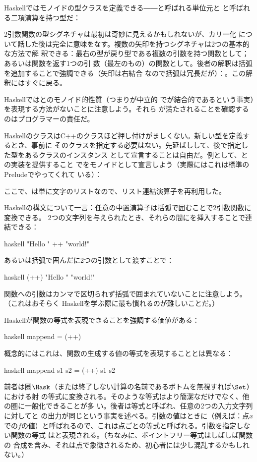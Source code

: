 Haskellではモノイドの型クラスを定義できる――と呼ばれる単位元と
と呼ばれる二項演算を持つ型だ：

2引数関数の型シグネチャは最初は奇妙に見えるかもしれないが、カリー化
について話した後は完全に意味をなす。複数の矢印を持つシグネチャは2つの基本的な方法で解
釈できる：最右の型が戻り型である複数の引数を持つ関数として；あるいは関数を返す1つの引
数（最左のもの）の関数として。後者の解釈は括弧を追加することで強調できる（矢印は右結合
なので括弧は冗長だが）：。この解釈にはすぐに戻る。

Haskellではとのモノイド的性質（つまりが中立的
でが結合的であるという事実）を表現する方法がないことに注意しよう。それら
が満たされることを確認するのはプログラマーの責任だ。

HaskellのクラスはC++のクラスほど押し付けがましくない。新しい型を定義するとき、事前に
そのクラスを指定する必要はない。先延ばしして、後で指定した型をあるクラスのインスタンス
として宣言することは自由だ。例として、との実装を提供すること
でをモノイドとして宣言しよう（実際にはこれは標準のPreludeでやってくれて
いる）：

ここで、は単に文字のリストなので、リスト連結演算子\code{(++)}を再利用した。

Haskellの構文について一言：任意の中置演算子は括弧で囲むことで2引数関数に変換できる。
2つの文字列を与えられたとき、それらの間に\code{++}を挿入することで連結できる：

\begin{snip}{haskell}
"Hello " ++ "world!"
\end{snip}
あるいは括弧で囲んだ\code{(++)}に2つの引数として渡すことで：

\begin{snip}{haskell}
(++) "Hello " "world!"
\end{snip}
関数への引数はカンマで区切られず括弧で囲まれていないことに注意しよう。（これはおそらく
Haskellを学ぶ際に最も慣れるのが難しいことだ。）

Haskellが関数の等式を表現できることを強調する価値がある：

\begin{snip}{haskell}
mappend = (++)
\end{snip}
概念的にはこれは、関数の生成する値の等式を表現することとは異なる：

\begin{snip}{haskell}
mappend s1 s2 = (++) s1 s2
\end{snip}
前者は圏$\Hask$（または終了しない計算の名前であるボトムを無視すれば$\Set$）における射
の等式に変換される。そのような等式はより簡潔なだけでなく、他の圏に一般化できることが多
い。後者は等式と呼ばれ、任意の2つの入力文字列に対してと
\code{(++)}の出力が同じという事実を述べる。引数の値はときに（例えば：点$x$
での$f$の値）と呼ばれるので、これは点ごとの等式と呼ばれる。引数を指定しない関数の等式
はと表現される。（ちなみに、ポイントフリー等式はしばしば関数の
合成を含み、それは点で象徴されるため、初心者には少し混乱するかもしれない。）


